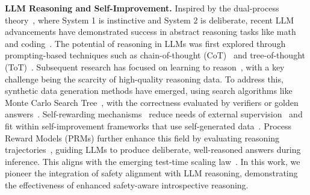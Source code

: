 \textbf{LLM Reasoning and Self-Improvement.} Inspired by the dual-process theory~\cite{evans2003two}, where System 1 is instinctive and System 2 is deliberate, recent LLM advancements have demonstrated success in abstract reasoning tasks like math~\cite{chen2024alphamath,chen2024step} and coding~\cite{liu2024codemind}. The potential of reasoning in LLMs was first explored through prompting-based techniques such as chain-of-thought (CoT)~\cite{wei2022chain} and tree-of-thought (ToT)~\cite{yao2023tree}. Subsequent research has focused on learning to reason~\cite{jaech2024openai}, with a key challenge being the scarcity of high-quality reasoning data. To address this, synthetic data generation methods have emerged, using search algorithms like Monte Carlo Search Tree~\cite{vodopivec2017monte}, with the correctness evaluated by verifiers or golden answers~\cite{luo2024improve,wan2024alphazero,jiao2024learning,zhang2024rest}. Self-rewarding mechanisms~\cite{yuanself} reduce needs of external supervision~\cite{zhang2024chain,chen2024language} and fit within self-improvement frameworks that use self-generated data~\cite{gulcehre2023reinforced,zhang2024chain,lee2024llm2llm}. Process Reward Models (PRMs) further enhance this field by evaluating reasoning trajectories~\cite{zhang2024rest,lightmanlet}, guiding LLMs to produce deliberate, well-reasoned answers during inference. This aligns with the emerging test-time scaling law~\cite{snell2024scaling}. In this work, we pioneer the integration of safety alignment with LLM reasoning, demonstrating the effectiveness of enhanced safety-aware introspective reasoning. 
